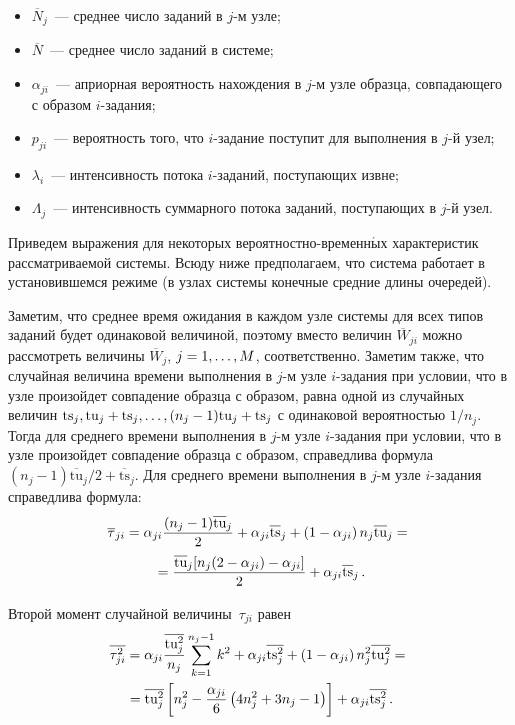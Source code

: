 \begin{multicols}{2}
\begin{itemize}
\columnbreak

\item
$\overline{N}_j$~--- среднее число заданий в $j$-м узле;
\item
$\overline{N}$~--- среднее число заданий в системе;
\item
$\alpha_{ji}$~--- априорная вероятность нахождения в $j$-м узле образца,
совпадающего с образом $i$-за\-да\-ния;
\item
$p_{ji}$~--- вероятность того, что $i$-за\-да\-ние поступит для выполнения в
$j$-й узел;
\item
$\lambda_i$~--- интенсивность потока $i$-за\-да\-ний, поступающих извне;
\item
$\Lambda_j$~--- интенсивность суммарного потока заданий, поступающих в
$j$-й узел.
\end{itemize}

Приведем выражения для некоторых
ве\-ро\-ят\-но\-ст\-но-вре\-мен\-н$\acute{\mbox{ы}}$х характеристик
рассматриваемой системы. Всюду ниже предполагаем, что система работает в
установившемся режиме (в узлах системы конечные средние длины очередей).

Заметим, что среднее время ожидания в каждом узле системы для всех типов
заданий будет одинаковой величиной, поэтому вместо величин
$\overline{W}_{\!ji}$ можно рассмотреть величины $\overline{W}_{\!j}$, $j\hm= 1,
\ldots ,M$, соответственно. Заметим также, что случайная величина времени
выполнения в $j$-м узле $i$-за\-да\-ния при условии, что в узле произойдет
совпадение образца с образом, равна одной из случайных величин $\mbox{ts}_j, \mbox{tu}_j
\hm+\mbox{ts}_j, \ldots , (n_j-1)\mbox{tu}_j\hm+\mbox{ts}_j$ с одинаковой вероятностью $1/n_j$. Тогда
для среднего времени выполнения в $j$-м узле $i$-за\-да\-ния при условии, что
в узле произойдет совпадение образца с образом, справедлива формула $(n_j-
1)\overline{\mbox{tu}}_j/2+\overline{\mbox{ts}}_j$.
Для среднего времени выполнения в $j$-м
узле $i$-за\-да\-ния справедлива формула:
\begin{multline}
\overline{\tau}_{ji} =\alpha_{ji} \displaystyle\frac{\displaystyle (n_j-1)\overline{\mbox{tu}}_j\mathstrut}{\displaystyle 2\mathstrut}+ \alpha_{ji}
\overline{\mbox{ts}}_j + \left( 1-\alpha_{ji}\right) n_j \overline{\mbox{tu}}_j ={}\\
{}= \displaystyle\frac{\displaystyle \overline{\mbox{tu}}_j [
n_j(2-\alpha_{ji})-\alpha_{ji}]\mathstrut}{\displaystyle 2\mathstrut}+\alpha_{ji} \overline{\mbox{ts}}_j\,.
\label{e1-aga}
\end{multline}

Второй момент случайной величины~$\tau_{ji}$ равен
\begin{multline}
\overline{\tau^2_{ji}}= \alpha_{ji} \displaystyle\frac{\displaystyle \overline{\mbox{tu}^2_j}\mathstrut}{\displaystyle n_j\mathstrut}
\sum\limits_{k=1}^{n_j-1} k^2 +\alpha_{ji} \overline{\mbox{ts}^2_j} +\left( 1-
\alpha_{ji}\right) n^2_j \overline{\mbox{tu}^2_j}={}\\
{}= \overline{\mbox{tu}^2_j} \left[ n^2_j -\displaystyle\frac{\displaystyle \alpha_{ji}\mathstrut}{\displaystyle 6\mathstrut}
\left(  4n^2_j +3n_j-
1\right)\right] +\alpha_{ji} \overline{\mbox{ts}^2_j}\,.
\label{e2-aga}
\end{multline}


\end{multicols}
